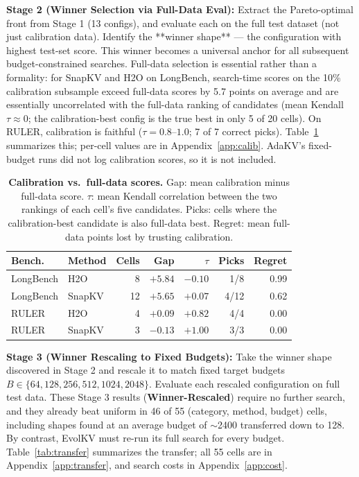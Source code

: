 \documentclass[11pt]{article}
\begin{document}
\textbf{Stage 2 (Winner Selection via Full-Data Eval):} Extract the Pareto-optimal front from Stage 1 (13 configs), and evaluate each on the full test dataset (not just calibration data). Identify the **winner shape** — the configuration with highest test-set score. This winner becomes a universal anchor for all subsequent budget-constrained searches. Full-data selection is essential rather than a formality: for SnapKV and H2O on LongBench, search-time scores on the 10\% calibration subsample exceed full-data scores by 5.7 points on average and are essentially uncorrelated with the full-data ranking of candidates (mean Kendall $\tau \approx 0$; the calibration-best config is the true best in only 5 of 20 cells). On RULER, calibration is faithful ($\tau = 0.8$–$1.0$; 7 of 7 correct picks). Table~\ref{tab:calib} summarizes this; per-cell values are in Appendix~\ref{app:calib}. AdaKV's fixed-budget runs did not log calibration scores, so it is not included.

\begin{table}[t]
  \centering
  \footnotesize
  \setlength{\tabcolsep}{2.5pt}
  \begin{tabular}{@{} l l r r r r r @{}}
    \toprule
    \textbf{Bench.} & \textbf{Method} & \textbf{Cells} & \textbf{Gap} & \textbf{$\tau$} & \textbf{Picks} & \textbf{Regret} \\
    \midrule
    \rowcolor{gray!10}
    LongBench & H2O    & 8  & $+5.84$ & $-0.10$ & 1/8  & 0.99 \\
    LongBench & SnapKV & 12 & $+5.65$ & $+0.07$ & 4/12 & 0.62 \\
    \rowcolor{gray!10}
    RULER     & H2O    & 4  & $+0.09$ & $+0.82$ & 4/4  & 0.00 \\
    RULER     & SnapKV & 3  & $-0.13$ & $+1.00$ & 3/3  & 0.00 \\
    \bottomrule
  \end{tabular}
  \caption{\textbf{Calibration vs.\ full-data scores.} Gap: mean calibration minus full-data score. $\tau$: mean Kendall correlation between the two rankings of each cell's five candidates. Picks: cells where the calibration-best candidate is also full-data best. Regret: mean full-data points lost by trusting calibration.}
  \label{tab:calib}
\end{table}

\textbf{Stage 3 (Winner Rescaling to Fixed Budgets):} Take the winner shape discovered in Stage 2 and rescale it to match fixed target budgets $B \in \{64, 128, 256, 512, 1024, 2048\}$. Evaluate each rescaled configuration on full test data. These Stage 3 results (\textbf{Winner-Rescaled}) require no further search, and they already beat uniform in 46 of 55 (category, method, budget) cells, including shapes found at an average budget of $\sim$2400 transferred down to 128. By contrast, EvolKV must re-run its full search for every budget. Table~\ref{tab:transfer} summarizes the transfer; all 55 cells are in Appendix~\ref{app:transfer}, and search costs in Appendix~\ref{app:cost}.
\end{document}
